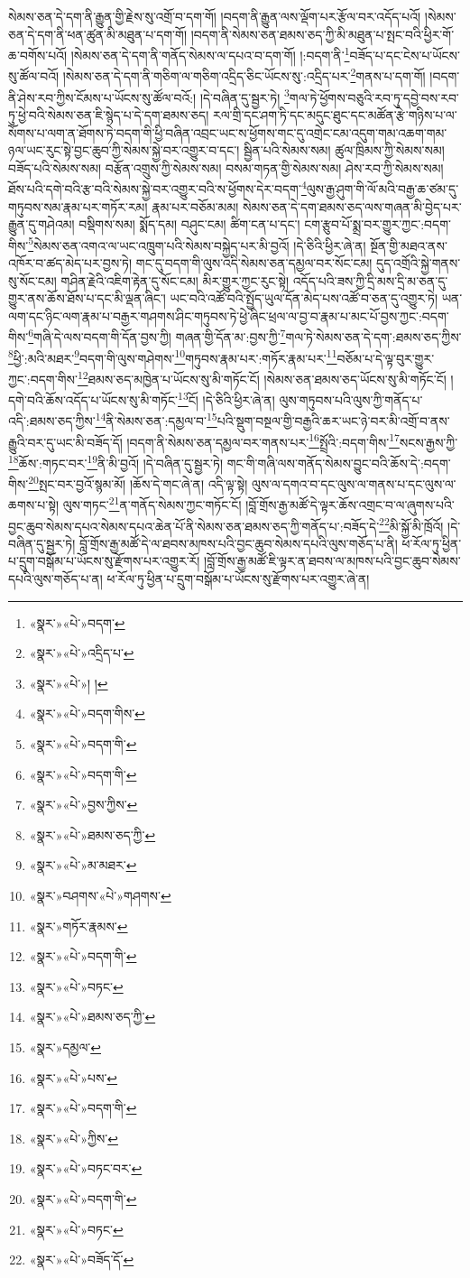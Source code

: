 སེམས་ཅན་དེ་དག་ནི་རྒྱུན་གྱི་རྗེས་སུ་འགྲོ་བ་དག་གོ། །བདག་ནི་རྒྱུན་ལས་ལྡོག་པར་རྩོལ་བར་འདོད་པའོ། །སེམས་ཅན་དེ་དག་ནི་ཕན་ཚུན་མི་མཐུན་པ་དག་གོ། །བདག་ནི་སེམས་ཅན་ཐམས་ཅད་ཀྱི་མི་མཐུན་པ་སྤང་བའི་ཕྱིར་གོ་ཆ་བགོས་པའོ། །སེམས་ཅན་དེ་དག་ནི་གནོད་སེམས་ལ་དཔའ་བ་དག་གོ། །:བདག་ནི་\footnote{«སྣར་»«པེ་»བདག་}བཟོད་པ་དང་ངེས་པ་ཡོངས་སུ་ཚོལ་བའོ། །སེམས་ཅན་དེ་དག་ནི་གཅིག་ལ་གཅིག་འདྲིད་ཅིང་ཡོངས་སུ་:འདྲིད་པར་\footnote{«སྣར་»«པེ་»འདྲིད་པ་}གནས་པ་དག་གོ། །བདག་ནི་ཤེས་རབ་ཀྱིས་ངོམས་པ་ཡོངས་སུ་ཚོལ་བའོ:། །དེ་བཞིན་དུ་སྦྱར་ཏེ། \footnote{«སྣར་»«པེ་»། ། }གལ་ཏེ་ཕྱོགས་བཅུའི་རབ་ཏུ་དབྱེ་བས་རབ་ཏུ་ཕྱེ་བའི་སེམས་ཅན་ཇི་སྙེད་པ་དེ་དག་ཐམས་ཅད། རལ་གྲི་དང་ཤག་ཏི་དང་མདུང་ཐུང་དང་མཚོན་རྩེ་གཉིས་པ་ལ་སོགས་པ་ལག་ན་ཐོགས་ཏེ་བདག་གི་ཕྱི་བཞིན་འབྲང་ཡང་ས་ཕྱོགས་གང་དུ་འགྲེང་ངམ་འདུག་གམ་འཆག་གམ་ཉལ་ཡང་རུང་སྟེ་བྱང་ཆུབ་ཀྱི་སེམས་སྐྱེ་བར་འགྱུར་བ་དང་། སྦྱིན་པའི་སེམས་སམ། ཚུལ་ཁྲིམས་ཀྱི་སེམས་སམ། བཟོད་པའི་སེམས་སམ། བརྩོན་འགྲུས་ཀྱི་སེམས་སམ། བསམ་གཏན་གྱི་སེམས་སམ། ཤེས་རབ་ཀྱི་སེམས་སམ། ཐོས་པའི་དགེ་བའི་རྩ་བའི་སེམས་སྐྱེ་བར་འགྱུར་བའི་ས་ཕྱོགས་དེར་བདག་\footnote{«སྣར་»«པེ་»བདག་གིས་}ལུས་རྒྱ་ཤུག་གི་ལོ་མའི་བརྒྱ་ཆ་ཙམ་དུ་གཏུབས་སམ་རྣམ་པར་གཏོར་རམ། རྣམ་པར་བཅོམ་མམ། སེམས་ཅན་དེ་དག་ཐམས་ཅད་ལས་གཞན་མི་བྱེད་པར་རྒྱུན་དུ་གཤེའམ། བསྡིགས་སམ། སྨོད་དམ། བཤུང་ངམ། ཚིག་ངན་པ་དང་། ངག་རྩུབ་པོ་སྨྲ་བར་གྱུར་ཀྱང་:བདག་གིས་\footnote{«སྣར་»«པེ་»བདག་གི་}སེམས་ཅན་འགའ་ལ་ཡང་འཁྲུག་པའི་སེམས་བསྐྱེད་པར་མི་བྱའོ། །དེ་ཅིའི་ཕྱིར་ཞེ་ན། སྔོན་གྱི་མཐའ་ནས་འཁོར་བ་ཚད་མེད་པར་བྱས་ཏེ། གང་དུ་བདག་གི་ལུས་འདི་སེམས་ཅན་དམྱལ་བར་སོང་ངམ། དུད་འགྲོའི་སྐྱེ་གནས་སུ་སོང་ངམ། གཤིན་རྗེའི་འཇིག་རྟེན་དུ་སོང་ངམ། མིར་གྱུར་ཀྱང་རུང་སྟེ། འདོད་པའི་ཟས་ཀྱི་དྲི་མས་དྲི་མ་ཅན་དུ་གྱུར་ནས་ཆོས་ཐོས་པ་དང་མི་ལྡན་ཞིང་། ཡང་བའི་འཚོ་བའི་སྤྱོད་ཡུལ་དོན་མེད་པས་འཚོ་བ་ཅན་དུ་འགྱུར་ཏེ། ཡན་ལག་དང་ཉིང་ལག་རྣམ་པ་བརྒྱར་གཤགས་ཤིང་གཏུབས་ཏེ་ཕྱེ་ཞིང་ཕྲལ་ལ་བྱ་བ་རྣམ་པ་མང་པོ་བྱས་ཀྱང་:བདག་གིས་\footnote{«སྣར་»«པེ་»བདག་གི་}གཞི་དེ་ལས་བདག་གི་དོན་བྱས་ཀྱི། གཞན་གྱི་དོན་མ་:བྱས་ཀྱི་\footnote{«སྣར་»«པེ་»བྱས་ཀྱིས་}གལ་ཏེ་སེམས་ཅན་དེ་དག་:ཐམས་ཅད་ཀྱིས་\footnote{«སྣར་»«པེ་»ཐམས་ཅད་ཀྱི་}ཕྱི་:མའི་མཐར་\footnote{«སྣར་»«པེ་»མ་མཐར་}བདག་གི་ལུས་གཤེགས་\footnote{«སྣར་»བཤགས་«པེ་»གཤགས་}གཏུབས་རྣམ་པར་:གཏོར་རྣམ་པར་\footnote{«སྣར་»གཏོར་རྣམས་}བཅོམ་པ་དེ་ལྟ་བུར་གྱུར་ཀྱང་:བདག་གིས་\footnote{«སྣར་»«པེ་»བདག་གི་}ཐམས་ཅད་མཁྱེན་པ་ཡོངས་སུ་མི་གཏོང་ངོ། །སེམས་ཅན་ཐམས་ཅད་ཡོངས་སུ་མི་གཏོང་ངོ། །དགེ་བའི་ཆོས་འདོད་པ་ཡོངས་སུ་མི་གཏོང་\footnote{«སྣར་»«པེ་»བཏང་}ངོ། །དེ་ཅིའི་ཕྱིར་ཞེ་ན། ལུས་གཏུབས་པའི་ལུས་ཀྱི་གནོད་པ་འདི་:ཐམས་ཅད་ཀྱིས་\footnote{«སྣར་»«པེ་»ཐམས་ཅད་ཀྱི་}ནི་སེམས་ཅན་:དམྱལ་བ་\footnote{«སྣར་»དམྱལ་}པའི་སྡུག་བསྔལ་གྱི་བརྒྱའི་ཆར་ཡང་ཉེ་བར་མི་འགྲོ་བ་ནས་རྒྱུའི་བར་དུ་ཡང་མི་བཟོད་དོ། །བདག་ནི་སེམས་ཅན་དམྱལ་བར་གནས་པར་\footnote{«སྣར་»«པེ་»པས་}སྤྲོའི་:བདག་གིས་\footnote{«སྣར་»«པེ་»བདག་གི་}སངས་རྒྱས་ཀྱི་\footnote{«སྣར་»«པེ་»ཀྱིས་}ཆོས་:གཏང་བར་\footnote{«སྣར་»«པེ་»བཏང་བར་}ནི་མི་བྱའོ། །དེ་བཞིན་དུ་སྦྱར་ཏེ། གང་གི་གཞི་ལས་གནོད་སེམས་བྱུང་བའི་ཆོས་དེ་:བདག་གིས་\footnote{«སྣར་»«པེ་»བདག་གི་}སྤང་བར་བྱའོ་སྙམ་མོ། །ཆོས་དེ་གང་ཞེ་ན། འདི་ལྟ་སྟེ། ལུས་ལ་དགའ་བ་དང་ལུས་ལ་གནས་པ་དང་ལུས་ལ་ཆགས་པ་སྟེ། ལུས་གཏང་\footnote{«སྣར་»«པེ་»བཏང་}ན་གནོད་སེམས་ཀྱང་གཏོང་ངོ། །བློ་གྲོས་རྒྱ་མཚོ་དེ་ལྟར་ཆོས་འགྲང་བ་ལ་ཞུགས་པའི་བྱང་ཆུབ་སེམས་དཔའ་སེམས་དཔའ་ཆེན་པོ་ནི་སེམས་ཅན་ཐམས་ཅད་ཀྱི་གནོད་པ་:བཟོད་དེ་\footnote{«སྣར་»«པེ་»བཟོད་དོ་}མི་སྐྱོ་མི་ཁྲོའོ། །དེ་བཞིན་དུ་སྦྱར་ཏེ། བློ་གྲོས་རྒྱ་མཚོ་དེ་ལ་ཐབས་མཁས་པའི་བྱང་ཆུབ་སེམས་དཔའི་ལུས་གཅོད་པ་ནི། ཕ་རོལ་ཏུ་ཕྱིན་པ་དྲུག་བསྒོམ་པ་ཡོངས་སུ་རྫོགས་པར་འགྱུར་རོ། །བློ་གྲོས་རྒྱ་མཚོ་ཇི་ལྟར་ན་ཐབས་ལ་མཁས་པའི་བྱང་ཆུབ་སེམས་དཔའི་ལུས་གཅོད་པ་ན། ཕ་རོལ་ཏུ་ཕྱིན་པ་དྲུག་བསྒོམ་པ་ཡོངས་སུ་རྫོགས་པར་འགྱུར་ཞེ་ན། 